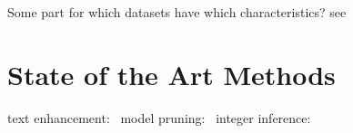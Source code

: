 Some part for which datasets have which characteristics? see~\cite{long_scene_2021}

\section{State of the Art Methods}

text enhancement:~\cite{chen_text_2021}
model pruning:~\cite{niu_26ms_2019}
integer inference:~\cite{ignatov_ai_2019}
